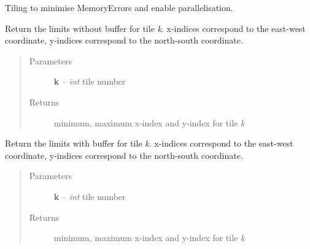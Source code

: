 \documentclass[letterpaper,10pt,english]{sphinxmanual}
\begin{document}

\begin{fulllineitems}
\label{docs/all_multipliers:all_multipliers.TileGrid}
Tiling to minimise MemoryErrors and enable parallelisation.


\begin{fulllineitems}
\label{docs/all_multipliers:all_multipliers.TileGrid.get_gridlimit}
Return the limits without buffer for tile \emph{k}. x-indices correspond to
the east-west coordinate, y-indices correspond to the north-south
coordinate.
\begin{quote}\begin{description}
\item[{Parameters}] \leavevmode
\textbf{k} -- \emph{int} tile number

\item[{Returns}] \leavevmode
minimum, maximum x-index and y-index for tile \emph{k}

\end{description}\end{quote}

\end{fulllineitems}



\begin{fulllineitems}
\label{docs/all_multipliers:all_multipliers.TileGrid.get_gridlimit_buffer}
Return the limits with buffer for tile \emph{k}. x-indices correspond to the
east-west coordinate, y-indices correspond to the north-south
coordinate.
\begin{quote}\begin{description}
\item[{Parameters}] \leavevmode
\textbf{k} -- \emph{int} tile number

\item[{Returns}] \leavevmode
minimum, maximum x-index and y-index for tile \emph{k}

\end{description}\end{quote}


\end{fulllineitems}
\end{fulllineitems}
\end{document}
